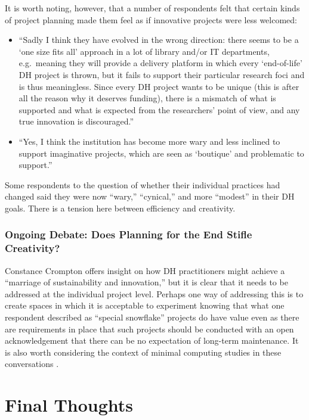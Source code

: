 \documentclass[final]{anthology-ch}
\begin{document}
It is worth noting, however, that a number of respondents felt that certain kinds of project planning made them feel as if innovative projects were less welcomed:

\begin{itemize}
  \item \enquote{Sadly I think they have evolved in the wrong direction: there seems to be a \enquote{one size fits all} approach in a lot of library and/or IT departments, e.g.\ meaning they will provide a delivery platform in which every \enquote{end-of-life} DH project is thrown, but it fails to support their particular research foci and is thus meaningless. Since every DH project wants to be unique (this is after all the reason why it deserves funding), there is a mismatch of what is supported and what is expected from the researchers' point of view, and any true innovation is discouraged.}
  \item \enquote{Yes, I think the institution has become more wary and less inclined to support imaginative projects, which are seen as \enquote{boutique} and problematic to support.}
\end{itemize}

Some respondents to the question of whether their individual practices had changed said they were now \enquote{wary,} \enquote{cynical,} and more \enquote{modest} in their DH goals. There is a tension here between efficiency and creativity.

\subsubsection{Ongoing Debate: Does Planning for the End Stifle Creativity?}

Constance Crompton \cite{crompton2023boutique} offers insight on how DH practitioners might achieve a \enquote{marriage of sustainability and innovation,} but it is clear that it needs to be addressed at the individual project level. Perhaps one way of addressing this is to create spaces in which it is acceptable to experiment knowing that what one respondent described as \enquote{special snowflake} projects do have value even as there are requirements in place that such projects should be conducted with an open acknowledgement that there can be no expectation of long-term maintenance. It is also worth considering the context of minimal computing studies in these conversations \cite{risam2022introduction}.

\section{Final Thoughts} \label{sec:final}
\end{document}
